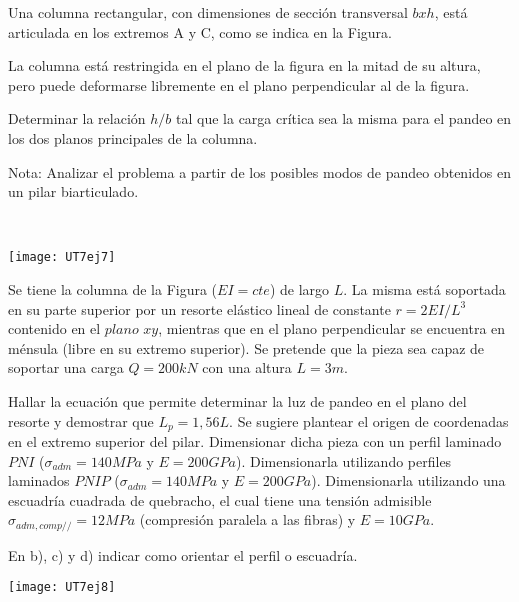 \ejercicio

\begin{minipage}[b]{0.6\textwidth}

Una columna rectangular, con dimensiones de sección transversal $bxh$, está articulada en los extremos A y C, como se indica en la Figura.

La columna está restringida en el plano de la figura en la mitad de su altura, pero puede deformarse libremente en el plano perpendicular al de la figura.

Determinar la relación $h/b$ tal que la carga crítica sea la misma para el pandeo en los dos planos principales de la columna.

Nota: Analizar el problema a partir de los posibles modos de pandeo obtenidos en un pilar biarticulado.

\end{minipage}
~
\begin{minipage}[b]{0.4\textwidth}
\begin{center}
\texttt{[image: UT7ej7]}
\end{center}
\end{minipage}

\ejercicio

Se tiene la columna de la Figura ($EI=cte$) de largo $L$. La misma está soportada en su parte superior por un resorte elástico lineal de constante $r=2EI/L^3$ contenido en el $plano$ $xy$, mientras que en el plano perpendicular se encuentra en ménsula (libre en su extremo superior). Se pretende que la pieza sea capaz de soportar una carga $Q=200 kN$ con una altura $L=3m$.

\parte Hallar la ecuación que permite determinar la luz de pandeo en el plano del resorte y demostrar que $L_p=1,56L$. Se sugiere plantear el origen de coordenadas en el extremo superior del pilar.
\parte Dimensionar dicha pieza con un perfil laminado $PNI$ ($\sigma_{adm}=140MPa$ y $E=200GPa$).
\parte Dimensionarla utilizando perfiles laminados $PNIP$ ($\sigma_{adm}=140MPa$ y $E=200GPa$). 
\parte Dimensionarla utilizando una escuadría cuadrada de quebracho, el cual tiene una tensión admisible $\sigma_{adm,comp//}=12MPa$ (compresión paralela a las fibras) y $E=10GPa$.

En b), c) y d) indicar como orientar el perfil o escuadría.

\begin{center}
\texttt{[image: UT7ej8]}
\end{center}


